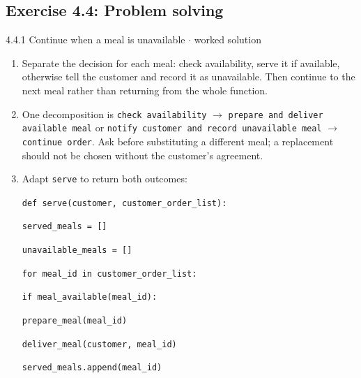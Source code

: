 \documentclass[11pt]{article}
\begin{document}
\begin{keepsection}\subsection{Exercise 4.4: Problem solving}

\begin{workedbox}{4.4.1 Continue when a meal is unavailable \ensuremath{\cdot} worked solution}
\begin{enumerate}
\item Separate the decision for each meal: check availability, serve it if available, otherwise tell the customer and record it as unavailable. Then continue to the next meal rather than returning from the whole function.
\item One decomposition is \texttt{check availability} \ensuremath{\to} \texttt{prepare and deliver available meal} or \texttt{notify customer and record unavailable meal} \ensuremath{\to} \texttt{continue order}. Ask before substituting a different meal; a replacement should not be chosen without the customer's agreement.
\item {}
Adapt \texttt{serve} to return both outcomes:
\begin{tcolorbox}[colback=Paperblue,colframe=Paperblue,boxrule=0pt,arc=0pt,left=7pt,right=7pt,top=5pt,bottom=5pt]\small\sloppy
\noindent\hspace*{0em}\texttt{def serve(customer, customer\_order\_list):}\par
\noindent\hspace*{1em}\texttt{served\_meals = []}\par
\noindent\hspace*{1em}\texttt{unavailable\_meals = []}\par
\noindent\hspace*{1em}\texttt{for meal\_id in customer\_order\_list:}\par
\noindent\hspace*{3em}\texttt{if meal\_available(meal\_id):}\par
\noindent\hspace*{5em}\texttt{prepare\_meal(meal\_id)}\par
\noindent\hspace*{5em}\texttt{deliver\_meal(customer, meal\_id)}\par
\noindent\hspace*{5em}\texttt{served\_meals.append(meal\_id)}\par

\end{tcolorbox}
\end{enumerate}
\end{workedbox}
\end{keepsection}
\end{document}
